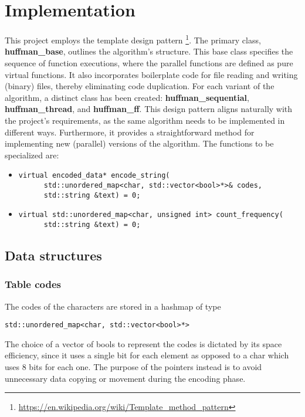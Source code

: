 \documentclass{article}
\begin{document}
\section{Implementation}
This project employs the template design pattern \footnote{\url{https://en.wikipedia.org/wiki/Template_method_pattern}}. The primary class, \textbf{huffman\_base}, outlines the algorithm's structure.
This base class specifies the sequence of function executions, where the parallel functions are defined as pure virtual functions.
It also incorporates boilerplate code for file reading and writing (binary) files, thereby eliminating code duplication.
For each variant of the algorithm, a distinct class has been created: \textbf{huffman\_sequential}, \textbf{huffman\_thread}, and \textbf{huffman\_ff}.
This design pattern aligns naturally with the project's requirements, as the same algorithm needs to be implemented in different ways.
Furthermore, it provides a straightforward method for implementing new (parallel) versions of the algorithm.
The functions to be specialized are:
\begin{itemize}
    \item \begin{verbatim}
virtual encoded_data* encode_string(
      std::unordered_map<char, std::vector<bool>*>& codes,
      std::string &text) = 0;
\end{verbatim}
    \item \begin{verbatim}
virtual std::unordered_map<char, unsigned int> count_frequency(
      std::string &text) = 0;
    \end{verbatim}
\end{itemize}

\subsection{Data structures}
\subsubsection{Table codes}
The codes of the characters are stored in a hashmap of type
\begin{verbatim}
std::unordered_map<char, std::vector<bool>*>
\end{verbatim}
The choice of a vector of bools to represent the codes is dictated by its space efficiency, since it uses a single bit for each element
as opposed to a char which uses 8 bits for each one.
The purpose of the pointers instead is to avoid unnecessary data copying or movement during the encoding phase.
\end{document}
